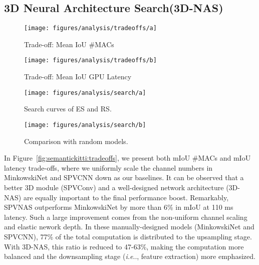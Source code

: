 \documentclass[runningheads]{llncs}
\makeatletter
\newcommand{\fig}[1]{Figure~\ref{#1}}
\DeclareRobustCommand\onedot{\futurelet\@let@token\@onedot}
\def\@onedot{\ifx\@let@token.\else.\null\fi\xspace}
\def\ie{\emph{i.e}\onedot} \def\Ie{\emph{I.e}\onedot}
\def\moduleshort{SPVConv\xspace}
\def\cnnshort{SPVCNN\xspace}
\def\modelshort{SPVNAS\xspace}
\def\nas{3D Neural Architecture Search\xspace}
\def\nasshort{3D-NAS\xspace}
\makeatother
\begin{document}
\subsection{\nas (\nasshort)}

\begin{figure*}[t]
\begin{subfigure}[t]{0.49\linewidth}
    \centering
    \texttt{[image: figures/analysis/tradeoffs/a]}
    \caption{Trade-off: Mean IoU \vs \#MACs}
\end{subfigure}
\begin{subfigure}[t]{0.495\linewidth}
    \centering
    \texttt{[image: figures/analysis/tradeoffs/b]}
    \caption{Trade-off: Mean IoU \vs GPU Latency}
\end{subfigure}
\caption{An efficient 3D module (\moduleshort) and a well-designed network architecture (\nasshort) are equally important to the final performance of \modelshort: \textbf{7.6} computation reduction and \textbf{2.7} measured speedup over MinkowskiNet.}
\label{fig:semantickitti:tradeoffs}
\end{figure*} \begin{figure*}[t]
\centering
\begin{subfigure}[t]{0.49\linewidth}
    \centering
    \texttt{[image: figures/analysis/search/a]}
    \caption{Search curves of ES and RS.}
    \label{fig:analysis:search:a}
\end{subfigure}
\begin{subfigure}[t]{0.49\linewidth}
    \centering
    \texttt{[image: figures/analysis/search/b]}
    \caption{Comparison with random models.}
    \label{fig:analysis:search:b}
\end{subfigure}
\caption{Evolutionary Search (ES) is more sample-efficient than Random Search (RS).}
\label{fig:analysis:search}
\end{figure*}
 
In \fig{fig:semantickitti:tradeoffs}, we present both mIoU \vs \#MACs and mIoU \vs latency trade-offs, where we uniformly scale the channel numbers in MinkowskiNet and \cnnshort down as our baselines. It can be observed that a better 3D module (\moduleshort) and a well-designed network architecture (\nasshort) are equally important to the final performance boost. Remarkably, \modelshort outperforms MinkowskiNet by more than 6\% in mIoU at 110 ms latency. Such a large improvement comes from the non-uniform channel scaling and elastic nework depth. In these manually-designed models (MinkowskiNet and \cnnshort), 77\% of the total computation is distributed to the upsampling stage. With \nasshort, this ratio is reduced to 47-63\%, making the computation more balanced and the downsampling stage (\ie, feature extraction) more emphasized.
\end{document}
